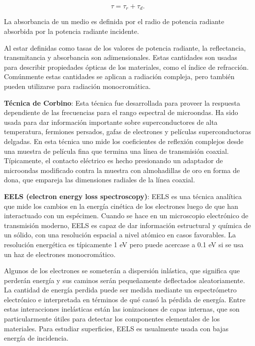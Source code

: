 \documentclass[a4paper,11pt]{article}
\numberwithin{equation}{section}
\begin{document}
\begin{equation}
 \tau =  \tau_r + \tau_d.
\end{equation}

La absorbancia de un medio es definida por el radio de potencia radiante absorbida 
por la potencia radiante incidente. 

\vspace{.3cm}

Al estar definidas como tasas de los valores de potencia radiante, la reflectancia, 
transmitancia y absorbancia son adimensionales. Estas cantidades son usadas 
para describir propiedades ópticas de los materiales, como el índice de refracción. 
Comúnmente estas cantidades se aplican a radiación compleja, pero también pueden 
utilizarse para radiación monocromática. 

\vspace{.3cm}

\textbf{Técnica de Corbino}: Esta técnica fue desarrollada para proveer la 
respuesta dependiente de las frecuencias  para el rango espectral de microondas. Ha 
sido usada para dar información importante sobre superconductores de alta 
temperatura, fermiones persados, gafas de electrones y películas superconductoras 
delgadas. En esta técnica uno mide los coeficientes de reflexión complejos desde 
una muestra de película fina que termina una línea de transmisión coaxial. 
Típicamente, el contacto eléctrico es hecho presionando un adaptador de microondas 
modificado contra la muestra con almohadillas de oro en forma de dona, que 
empareja las dimensiones radiales de la línea coaxial. 

\vspace{.3cm}

\textbf{EELS (electron energy loss spectroscopy)}: EELS es una técnica analítica que 
mide los cambios en la energía cinética de los electrones luego de que han interactuado 
con un espécimen. Cuando se hace en un microscopio electrónico de transmisión 
moderno, EELS es capaz de dar información estructural y química de un sólido, con 
una resolución espacial a nivel atómico en casos favorables. La resolución energética 
es típicamente 1 eV pero puede acercase a 0.1 eV si se usa un haz de electrones 
monocromático. 

\vspace{.3cm}

Algunos de los electrones se someterán a dispersión inlástica, que significa que 
perderán energía y sus caminos serán pequeñamente deflectados aleatoriamente. La 
cantidad de energía perdida puede ser medida mediante un espectrómetro electrónico 
e interpretada en términos de qué causó la pérdida de energía. Entre estas interacciones 
inelásticas están las ionizaciones de capas internas, que son particularmente 
útiles para detectar los componentes elementales de los materiales. Para estudiar 
superficies, EELS es usualmente usada con bajas energía de incidencia. 
\end{document}
